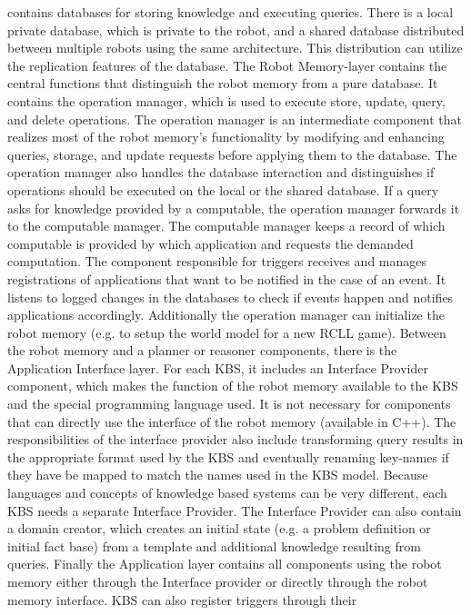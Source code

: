 {contains databases for storing knowledge and executing queries. There
is a local private database, which is private to the robot, and a
shared database distributed between multiple robots using the same
architecture. This distribution can utilize the replication features
of the database. The Robot Memory-layer contains the central functions
that distinguish the robot memory from a pure database. It contains
the operation manager, which is used to execute store, update, query,
and delete operations. The operation manager is an intermediate
component that realizes most of the robot memory's functionality by
modifying and enhancing queries, storage, and update requests before
applying them to the database. The operation manager also handles the
database interaction and distinguishes if operations should be
executed on the local or the shared database.  If a query asks for
knowledge provided by a computable, the operation manager forwards it
to the computable manager. The computable manager keeps a record of
which computable is provided by which application and requests the
demanded computation. The component responsible for triggers
receives and manages registrations of applications that want to be
notified in the case of an event. It listens to logged changes in the
databases to check if events happen and notifies applications
accordingly. Additionally the operation manager can initialize the
robot memory (e.g. to setup the world model for a new RCLL game).
Between the robot memory and a planner or reasoner components, there
is the Application Interface layer. For each KBS, it includes an
Interface Provider component, which makes the function of the robot
memory available to the KBS and the special programming language
used. It is not necessary for components that can directly use the
interface of the robot memory (available in C++). The responsibilities
of the interface provider also include transforming query results in
the appropriate format used by the KBS and eventually renaming
key-names if they have be mapped to match the names used in the KBS
model. Because languages and concepts of knowledge based systems can
be very different, each KBS needs a separate Interface Provider. The
Interface Provider can also contain a domain creator, which creates an
initial state (e.g. a problem definition or initial fact base) from a
template and additional knowledge resulting from queries. Finally the
Application layer contains all components using the robot memory
either through the Interface provider or directly through the robot
memory interface. KBS can also register triggers through their
}
